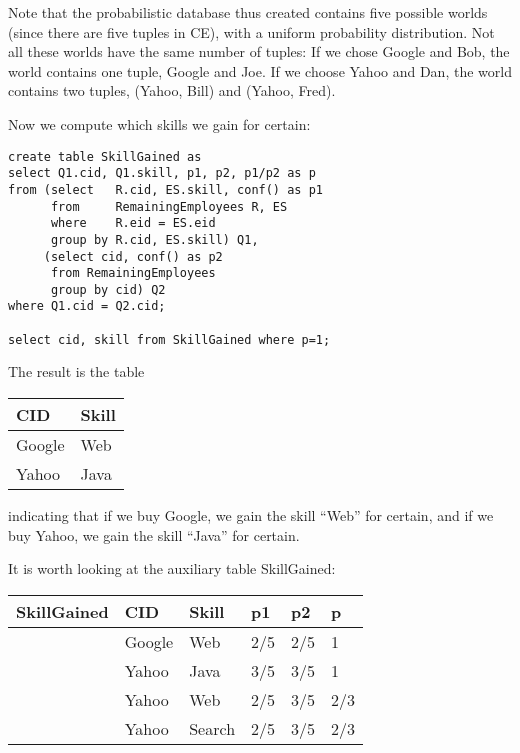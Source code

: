 Note that the probabilistic database thus created contains five possible
worlds (since there are five tuples in CE), with a uniform probability
distribution. Not all these worlds have the same number of tuples: If we chose
Google and Bob, the world contains one tuple, Google and Joe. If we choose
Yahoo and Dan, the world contains two tuples, (Yahoo, Bill) and (Yahoo, Fred).

Now we compute which skills we gain for certain:
\begin{verbatim}
create table SkillGained as
select Q1.cid, Q1.skill, p1, p2, p1/p2 as p
from (select   R.cid, ES.skill, conf() as p1
      from     RemainingEmployees R, ES
      where    R.eid = ES.eid
      group by R.cid, ES.skill) Q1,
     (select cid, conf() as p2
      from RemainingEmployees
      group by cid) Q2
where Q1.cid = Q2.cid;

select cid, skill from SkillGained where p=1;
\end{verbatim}

The result is the table
\begin{center}
\begin{tabular}{ll}
CID & Skill \\
\hline
Google & Web \\
Yahoo  & Java \\
\end{tabular}
\end{center}
indicating that if we buy Google, we gain the skill ``Web'' for certain, and
if we buy Yahoo, we gain the skill ``Java'' for certain.

It is worth looking at the auxiliary table SkillGained:
\begin{center}
\begin{tabular}{l|l@{~~}l@{~~}l@{~~}l@{~~}l}
SkillGained & CID   & Skill  & p1  & p2  &    p     \\
\hline
& Google & Web    & 2/5 & 2/5 &   1 \\
& Yahoo  & Java   & 3/5 & 3/5 &   1 \\
& Yahoo  & Web    & 2/5 & 3/5 & 2/3 \\
& Yahoo  & Search & 2/5 & 3/5 & 2/3 \\
\end{tabular}
\end{center}

